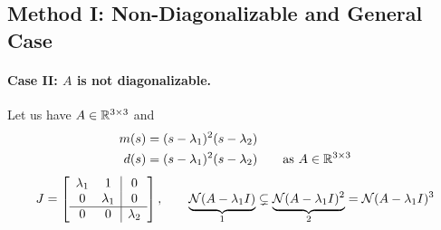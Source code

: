 \subsection{Method I: Non-Diagonalizable and General Case}\label{ss:method1-general}
%
\paragraph{Case II: $A$ is not diagonalizable.}\leavevmode\par\vspace{-0.6em}

\begin{example}
Let us have $A\in\mathbb{R}^{3\times3}$ and
\begin{align*}
m(s) &= (s-\lambda_1)^2(s-\lambda_2)\\
d(s) &= (s-\lambda_1)^2(s-\lambda_2) \qquad\text{as } A\in\mathbb{R}^{3\times3}
\end{align*}
\[
J = \left[\begin{array}{cc|c} \lambda_1 & 1 & 0\\ 0 & \lambda_1 & 0\\ \hline 0 & 0 & \lambda_2\end{array}\right],
\qquad
\underbrace{\mathcal{N}(A-\lambda_1I)}_{1} \subsetneq \underbrace{\mathcal{N}(A-\lambda_1I)^2}_{2} = \mathcal{N}(A-\lambda_1I)^3
\]


\end{example}
